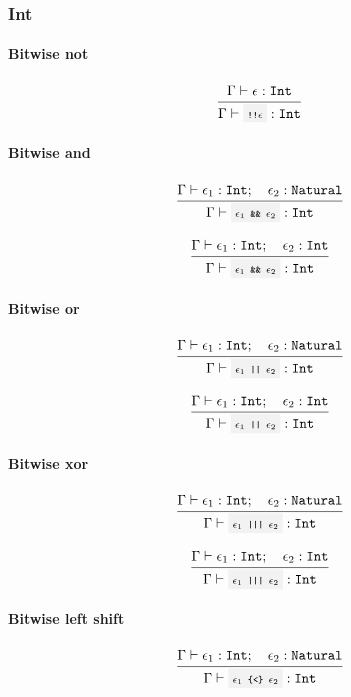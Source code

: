 \subsubsection{Int}

\paragraph{Bitwise not}

\[
	\infrule{
		\EnvSym\then \expr:\Int
	}{
		\EnvSym\then \code{!!$\expr$} : \Int
	}
\]

\paragraph{Bitwise and}

\[
	\infrule{
		\EnvSym\then \expr_1:\Int \semiq \expr_2:\Natural
	}{
		\EnvSym\then \code{$\expr_1$ \&\& $\expr_2$} : \Int
	}
\]

\[
	\infrule{
		\EnvSym\then \expr_1:\Int \semiq \expr_2:\Int
	}{
		\EnvSym\then \code{$\expr_1$ \&\& $\expr_2$} : \Int
	}
\]

\paragraph{Bitwise or}

\[
	\infrule{
		\EnvSym\then \expr_1:\Int \semiq \expr_2:\Natural
	}{
		\EnvSym\then \code{$\expr_1$ || $\expr_2$} : \Int
	}
\]

\[
	\infrule{
		\EnvSym\then \expr_1:\Int \semiq \expr_2:\Int
	}{
		\EnvSym\then \code{$\expr_1$ || $\expr_2$} : \Int
	}
\]

\paragraph{Bitwise xor}

\[
	\infrule{
		\EnvSym\then \expr_1:\Int \semiq \expr_2:\Natural
	}{
		\EnvSym\then \code{$\expr_1$ ||| $\expr_2$} : \Int
	}
\]

\[
	\infrule{
		\EnvSym\then \expr_1:\Int \semiq \expr_2:\Int
	}{
		\EnvSym\then \code{$\expr_1$ ||| $\expr_2$} : \Int
	}
\]

\paragraph{Bitwise left shift}

\[
	\infrule{
		\EnvSym\then \expr_1:\Int \semiq \expr_2:\Natural
	}{
		\EnvSym\then \code{$\expr_1$ \{<\} $\expr_2$} : \Int
	}
\]

